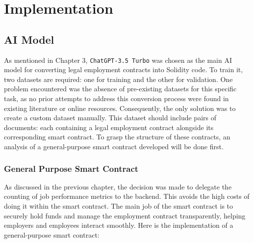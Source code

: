 \chapter{Implementation}

\section{AI Model}

As mentioned in Chapter 3, \texttt{ChatGPT-3.5 Turbo} was chosen as the main AI model for converting legal employment contracts into Solidity code. To train it, two datasets are required: one for training and the other for validation. One problem encountered was the absence of pre-existing datasets for this specific task, as no prior attempts to address this conversion process were found in existing literature or online resources. Consequently, the only solution was to create a custom dataset manually. This dataset should include pairs of documents:  each containing a legal employment contract alongside its corresponding smart contract. To grasp the structure of these contracts, an analysis of a general-purpose smart contract developed will be done first.

\subsection{General Purpose Smart Contract}

As discussed in the previous chapter, the decision was made to delegate the counting of job performance metrics to the backend. This avoids the high costs of doing it within the smart contract. The main job of the smart contract is to securely hold funds and manage the employment contract transparently, helping employers and employees interact smoothly. Here is the implementation of a general-purpose smart contract:

